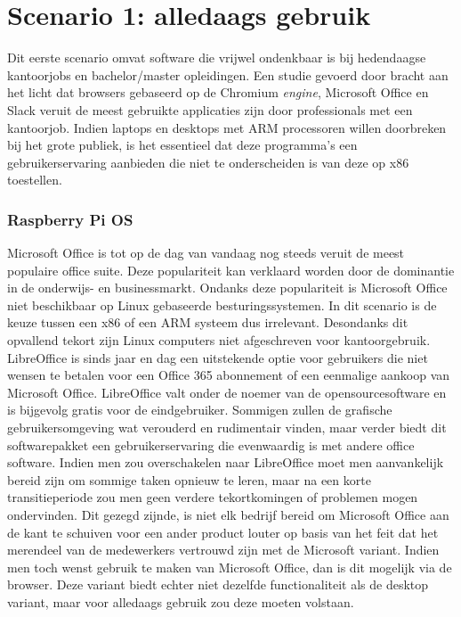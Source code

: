\newpage
\section{Scenario 1: alledaags gebruik}
Dit eerste scenario omvat software die vrijwel ondenkbaar is bij hedendaagse kantoorjobs en bachelor/master opleidingen. Een studie gevoerd door \textcite{Braganza2022} bracht aan het licht dat browsers gebaseerd op de Chromium \textit{engine}, Microsoft Office en Slack veruit de meest gebruikte applicaties zijn door professionals met een kantoorjob. Indien laptops en desktops met ARM processoren willen doorbreken bij het grote publiek, is het essentieel dat deze programma’s een gebruikerservaring aanbieden die niet te onderscheiden is van deze op x86 toestellen.

\subsubsection{Raspberry Pi OS}
Microsoft Office is tot op de dag van vandaag nog steeds veruit de meest populaire office suite. Deze populariteit kan verklaard worden door de dominantie in de onderwijs- en businessmarkt. Ondanks deze populariteit is Microsoft Office niet beschikbaar op Linux gebaseerde besturingssystemen. In dit scenario is de keuze tussen een x86 of een ARM systeem dus irrelevant. Desondanks dit opvallend tekort zijn Linux computers niet afgeschreven voor kantoorgebruik. LibreOffice is sinds jaar en dag een uitstekende optie voor gebruikers die niet wensen te betalen voor een Office 365 abonnement of een eenmalige aankoop van Microsoft Office. LibreOffice valt onder de noemer van de opensourcesoftware en is bijgevolg gratis voor de eindgebruiker. Sommigen zullen de grafische gebruikersomgeving wat verouderd en rudimentair vinden, maar verder biedt dit softwarepakket een gebruikerservaring die evenwaardig is met andere office software. Indien men zou overschakelen naar LibreOffice moet men aanvankelijk bereid zijn om sommige taken opnieuw te leren, maar na een korte transitieperiode zou men geen verdere tekortkomingen of problemen mogen ondervinden. Dit gezegd zijnde, is niet elk bedrijf bereid om Microsoft Office aan de kant te schuiven voor een ander product louter op basis van het feit dat het merendeel van de medewerkers vertrouwd zijn met de Microsoft variant. Indien men toch wenst gebruik te maken van Microsoft Office, dan is dit mogelijk via de browser. Deze variant biedt echter niet dezelfde functionaliteit als de desktop variant, maar voor alledaags gebruik zou deze moeten volstaan.

